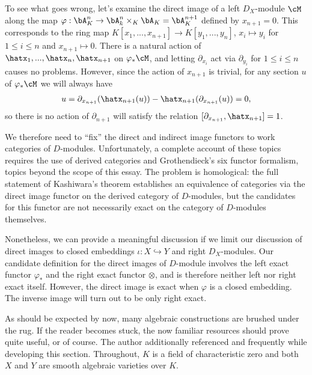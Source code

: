 \begin{example}\label{example:pushforward-naive-breaks}
	To see what goes wrong, let's examine the direct image of a left $D_X$-module $\cM$ along the map $\varphi:\bA^{n}_K\to \bA^{n}_k\times_K \bA_K = \bA^{n+1}_K$ defined by $x_{n+1} = 0$. This corresponds to the ring map $K[x_1,...,x_{n+1}]\to K[y_1,...,y_n]$, $x_i \mapsto y_i$ for $1\leq i\leq n$ and $x_{n+1}\mapsto 0$. There is a natural action of $\hatx_1,...,\hatx_n,\hatx_{n+1}$ on $\varphi_*\cM$, and letting $\partial_{x_i}$ act via $\partial_{y_i}$ for $1\leq i\leq n$ causes no problems. However, since the action of $x_{n+1}$ is trivial, for any section $u$ of $\varphi_*\cM$ we will always have
	\begin{align*}
		[\partial_{x_{n+1}},\hatx_{n+1}]u = \partial_{x_{n+1}}(\hatx_{n+1}(u)) - \hatx_{n+1}(\partial_{x_{n+1}}(u)) = 0,
	\end{align*}
	so there is no action of $\partial_{n+1}$ will satisfy the relation $[\partial_{x_{n+1}},\hatx_{n+1}] = 1$. 
\end{example}
We therefore need to ``fix'' the direct and indirect image functors to work categories of $D$-modules. Unfortunately, a complete account of these topics requires the use of derived categories and Grothendieck's six functor formalism, topics beyond the scope of this essay. The problem is homological: the full statement of Kashiwara's theorem establishes an equivalence of categories via the direct image functor on the derived category of $D$-modules, but the candidates for this functor are not necessarily exact on the category of $D$-modules themselves.

Nonetheless, we can provide a meaningful discussion if we limit our discussion of direct images to closed embeddings $\iota:X\hookrightarrow Y$ and right $D_X$-modules. Our candidate definition for the direct images of $D$-module involves the left exact functor $\varphi_*$ and the right exact functor $\otimes$, and is therefore neither left nor right exact itself. However, the direct image is exact when $\varphi$ is a closed embedding. The inverse image will turn out to be only right exact.

As should be expected by now, many algebraic constructions are brushed under the rug. If the reader becomes stuck, the now familiar resources \cite{ginzburg_d-mod} should prove quite useful, or \cite{hartshorne} of course. The author additionally referenced \cite{d-mod_ps-rt} and \cite{cschnell} frequently while developing this section. Throughout, $K$ is a field of characteristic zero and both $X$ and $Y$ are smooth algebraic varieties over $K$.


